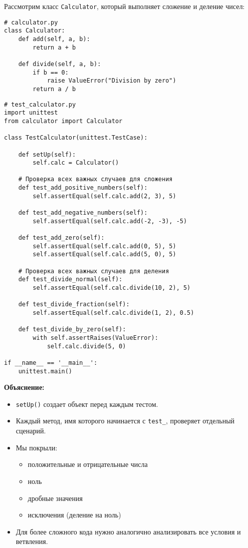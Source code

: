 Рассмотрим класс \texttt{Calculator}, который выполняет сложение и деление чисел:

\begin{verbatim}
# calculator.py
class Calculator:
    def add(self, a, b):
        return a + b

    def divide(self, a, b):
        if b == 0:
            raise ValueError("Division by zero")
        return a / b
\end{verbatim}

\begin{verbatim}
# test_calculator.py
import unittest
from calculator import Calculator

class TestCalculator(unittest.TestCase):

    def setUp(self):
        self.calc = Calculator()

    # Проверка всех важных случаев для сложения
    def test_add_positive_numbers(self):
        self.assertEqual(self.calc.add(2, 3), 5)

    def test_add_negative_numbers(self):
        self.assertEqual(self.calc.add(-2, -3), -5)

    def test_add_zero(self):
        self.assertEqual(self.calc.add(0, 5), 5)
        self.assertEqual(self.calc.add(5, 0), 5)

    # Проверка всех важных случаев для деления
    def test_divide_normal(self):
        self.assertEqual(self.calc.divide(10, 2), 5)

    def test_divide_fraction(self):
        self.assertEqual(self.calc.divide(1, 2), 0.5)

    def test_divide_by_zero(self):
        with self.assertRaises(ValueError):
            self.calc.divide(5, 0)

if __name__ == '__main__':
    unittest.main()
\end{verbatim}

\textbf{Объяснение:}  

\begin{itemize}
    \item \texttt{setUp()} создает объект перед каждым тестом.
    \item Каждый метод, имя которого начинается с \texttt{test\_}, проверяет отдельный сценарий.
    \item Мы покрыли:
    \begin{itemize}
        \item положительные и отрицательные числа
        \item ноль
        \item дробные значения
        \item исключения (деление на ноль)
    \end{itemize}
    \item Для более сложного кода нужно аналогично анализировать все условия и ветвления.
\end{itemize}

